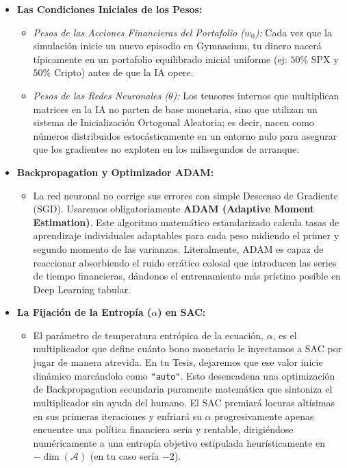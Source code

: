 \documentclass[11pt,a4paper]{article}
\begin{document}
\begin{itemize}
    \item \textbf{Las Condiciones Iniciales de los Pesos:}
    \begin{itemize}
        \item \textit{Pesos de las Acciones Financieras del Portafolio ($w_0$):} Cada vez que la simulación inicie un nuevo episodio en Gymnasium, tu dinero nacerá típicamente en un portafolio equilibrado inicial uniforme (ej: $50\%$ SPX y $50\%$ Cripto) antes de que la IA opere.
        \item \textit{Pesos de las Redes Neuronales ($\theta$):} Los tensores internos que multiplican matrices en la IA no parten de base monetaria, sino que utilizan un sistema de Inicialización Ortogonal Aleatoria; es decir, nacen como números distribuidos estocásticamente en un entorno nulo para asegurar que los gradientes no exploten en los milisegundos de arranque.
    \end{itemize}
    
    \item \textbf{Backpropagation y Optimizador ADAM:}
    \begin{itemize}
        \item La red neuronal no corrige sus errores con simple Descenso de Gradiente (SGD). Usaremos obligatoriamente \textbf{ADAM (Adaptive Moment Estimation)}. Este algoritmo matemático estandarizado calcula tasas de aprendizaje individuales adaptables para cada peso midiendo el primer y segundo momento de las varianzas. Literalmente, ADAM es capaz de reaccionar absorbiendo el ruido errático colosal que introducen las series de tiempo financieras, dándonos el entrenamiento más prístino posible en Deep Learning tabular.
    \end{itemize}
    
    \item \textbf{La Fijación de la Entropía ($\alpha$) en SAC:}
    \begin{itemize}
        \item El parámetro de temperatura entrópica de la ecuación, $\alpha$, es el multiplicador que define cuánto bono monetario le inyectamos a SAC por jugar de manera atrevida. En tu Tesis, dejaremos que ese valor inicie dinámico marcándolo como \texttt{"auto"}. Esto desencadena una optimización de Backpropagation secundaria puramente matemática que sintoniza el multiplicador sin ayuda del humano. El SAC premiará locuras altísimas en sus primeras iteraciones y enfriará su $\alpha$ progresivamente apenas encuentre una política financiera seria y rentable, dirigiéndose numéricamente a una entropía objetivo estipulada heurísticamente en $-\dim(\mathcal{A})$ (en tu caso sería $-2$).
    \end{itemize}
\end{itemize}
\end{document}
